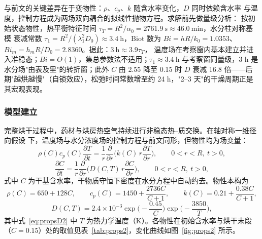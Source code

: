 与前文的关键差异在于变物性：$\rho$、$c_p$、$k$ 随含水率变化，$D$ 同时依赖含水率
与温度，控制方程成为两场双向耦合的拟线性抛物方程。求解前先做量级分析：
按初始状态物性，热平衡特征时间
$\tau_T=R^2/\alpha_0=2761.9\ \mathrm{s}\approx46.0\ \mathrm{min}$，水分柱对称基模
衰减常数
$\tau_1=R^2/(\lambda_1^2D_0)\approx3.4\ \mathrm{h}$，Biot 数为
$Bi=hR/k_0=1.0353$、$Bi_m=h_mR/D_0=2.8360$。据此：$3\ \mathrm{h}\approx3.9\tau_T$，
温度场在考察窗内基本建立并进入准稳态；$Bi=O(1)$，集总参数法不适用；$\tau_1\approx
3.4\ \mathrm{h}$ 与考察窗同量级，3 h 是水分场"由表及里"的转折窗；此外 $C$ 由 2.55
降至 0.15 时 $D$ 衰减 16.8 倍——后期"越烘越慢"（自锁效应），松弛时间常数增至约
24 h，"2–3 天"的干燥周期正是其宏观表现。

\subsubsection{模型建立}

完整烘干过程中，药材与烘房热空气持续进行非稳态热--质交换。在轴对称一维径向假设
下，温度场与水分浓度场的控制方程与前文同形，但物性均为场变量：
\begin{equation}
  \rho(C)c_p(C)\frac{\partial T}{\partial t}
  =\frac{1}{r}\frac{\partial}{\partial r}\Big(k(C)\,r\frac{\partial T}{\partial r}\Big),
  \qquad 0<r<R,\ t>0,
  \label{eq:heat2}
\end{equation}
\begin{equation}
  \frac{\partial C}{\partial t}
  =\frac{1}{r}\frac{\partial}{\partial r}\Big(D(C,T)\,r\frac{\partial C}{\partial r}\Big),
  \qquad 0<r<R,\ t>0,
  \label{eq:moist2}
\end{equation}
式中 $C$ 为干基含水率，干物质守恒下密度在水分方程中自动约去。物性本构为
\begin{equation}
  \rho(C)=650+128C,
  \qquad
  c_p(C)=1450+\frac{2736C}{C+1},
  \qquad
  k(C)=0.21+\frac{0.38C}{C+1},
  \label{eq:props2}
\end{equation}
\begin{equation}
  D(C,T)=2.4\times10^{-3}\exp\Big(-\frac{0.45}{C}\Big)\exp\Big(-\frac{3850}{T}\Big),
  \label{eq:propsD2}
\end{equation}
其中式~\eqref{eq:propsD2} 中 $T$ 为热力学温度（K）。各物性在初始含水率与烘干末段
（$C=0.15$）处的取值见表~\ref{tab:props2}，变化曲线如图~\ref{fig:props2} 所示。

